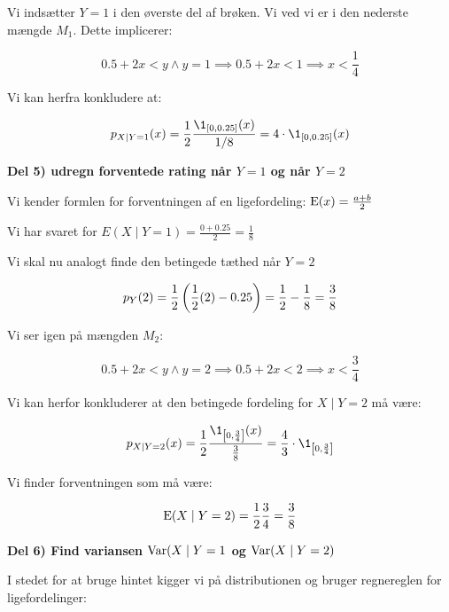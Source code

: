 Vi indsætter $Y=1$ i den øverste del af brøken. Vi ved vi er i den nederste mængde $M_1$. Dette implicerer:

\begin{equation}
    0.5 + 2x < y \land y = 1 \implies  0.5 +2x < 1 \implies x < \frac{1}{4}
\end{equation}

Vi kan herfra konkludere at:

\begin{equation}
    p_{X\mid Y=1}(x) = \frac{1}{2}\frac{\1_{[0, 0.25]}(x)}{1/8} = 4\cdot \1_{[0, 0.25]}(x)
\end{equation}

\textbf{Del 5) udregn forventede rating når $Y=1$ og når $Y=2$}

Vi kender formlen for forventningen af en ligefordeling: $\text{E}(x) = \frac{a + b}{2}$

Vi har svaret for $E(X \mid Y=1) = \frac{0 + 0.25}{2} = \frac{1}{8}$

Vi skal nu analogt finde den betingede tæthed når $Y=2$

\begin{equation}
    p_Y(2) =  \frac{1}{2}\left( \frac{1}{2}(2) - 0.25\right) = \frac{1}{2} - \frac{1}{8} = \frac{3}{8} 
\end{equation}

Vi ser igen på mængden $M_2:$

\begin{equation}
    0.5 + 2x < y \land y=2 \implies 0.5 + 2x < 2 \implies x < \frac{3}{4}
\end{equation}

Vi kan herfor konkluderer at den betingede fordeling for $X \mid Y=2$ må være:

\begin{equation}
    p_{X \mid Y=2} (x) = \frac{1}{2}\frac{\1_{\lsp0,\frac{3}{4}\rsp}(x)}{\frac{3}{8}} = \frac{4}{3} \cdot \1_{\lsp0,\frac{3}{4}\rsp} 
\end{equation}

Vi finder forventningen som må være:

\begin{equation}
    \text{E}(X\mid Y=2) = \frac{1}{2}\frac{3}{4}=\frac{3}{8}
\end{equation}

\textbf{Del 6) Find variansen $\text{Var}(X \mid Y = 1$ og $\text{Var}(X\mid Y=2)$}

I stedet for at bruge hintet kigger vi på distributionen og bruger regnereglen for ligefordelinger:

